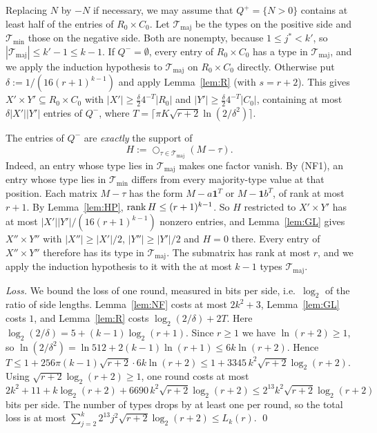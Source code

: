 Replacing $N$ by $-N$ if necessary, we may assume that $Q^+=\{N>0\}$ contains at least half of the entries of
$R_0\times C_0$. Let $\mathcal T_{\mathrm{maj}}$ be the types on the positive side and $\mathcal T_{\mathrm{min}}$ those on the
negative side. Both are nonempty, because $1\le j^\ast<k'$, so $|\mathcal T_{\mathrm{maj}}|\le k'-1\le k-1$. If
$Q^-=\emptyset$, every entry of $R_0\times C_0$ has a type in $\mathcal T_{\mathrm{maj}}$, and we apply the induction
hypothesis to $\mathcal T_{\mathrm{maj}}$ on $R_0\times C_0$ directly. Otherwise put $\delta:=1/(16(r+1)^{k-1})$ and
apply Lemma~\ref{lem:R} (with $s=r+2$). This gives $X'\times Y'\subseteq R_0\times C_0$ with
$|X'|\ge\frac\delta24^{-T}|R_0|$ and $|Y'|\ge\frac\delta24^{-T}|C_0|$, containing at most $\delta|X'||Y'|$ entries of
$Q^-$, where $T=\lceil\pi K\sqrt{r+2}\ln(2/\delta^2)\rceil$.

The entries of $Q^-$ are \emph{exactly} the support of
\[
  H:=\mathop{\bigcirc}_{\tau\in\mathcal T_{\mathrm{maj}}}(M-\tau).
\]
Indeed, an entry whose type lies in $\mathcal T_{\mathrm{maj}}$ makes one factor vanish. By (NF1), an entry whose
type lies in $\mathcal T_{\mathrm{min}}$ differs from every majority-type value at that position. Each matrix
$M-\tau$ has the form $M-a\mathbf 1^T$ or $M-\mathbf 1b^T$, of rank at most $r+1$. By Lemma~\ref{lem:HP},
$\operatorname{rank} H\le(r+1)^{k-1}$. So $H$ restricted to $X'\times Y'$ has at most $|X'||Y'|/(16(r+1)^{k-1})$ nonzero entries,
and Lemma~\ref{lem:GL} gives $X''\times Y''$ with $|X''|\ge|X'|/2$, $|Y''|\ge|Y'|/2$ and $H=0$ there. Every entry
of $X''\times Y''$ therefore has its type in $\mathcal T_{\mathrm{maj}}$. The submatrix has rank at most $r$, and we
apply the induction hypothesis to it with the at most $k-1$ types $\mathcal T_{\mathrm{maj}}$.

\emph{Loss.} We bound the loss of one round, measured in bits per side, i.e.\ $\log_2$ of the ratio of side
lengths. Lemma~\ref{lem:NF} costs at most $2k^2+3$, Lemma~\ref{lem:GL} costs $1$, and Lemma~\ref{lem:R} costs
$\log_2(2/\delta)+2T$. Here $\log_2(2/\delta)=5+(k-1)\log_2(r+1)$. Since $r\ge1$ we have $\ln(r+2)\ge1$, so
$\ln(2/\delta^2)=\ln 512+2(k-1)\ln(r+1)\le 6k\ln(r+2)$. Hence
$T\le1+256\pi(k-1)\sqrt{r+2}\cdot 6k\ln(r+2)\le 1+3345\,k^2\sqrt{r+2}\log_2(r+2)$. Using
$\sqrt{r+2}\log_2(r+2)\ge1$, one round costs at most
\[
2k^2+11+k\log_2(r+2)+6690\,k^2\sqrt{r+2}\log_2(r+2)\le 2^{13}k^2\sqrt{r+2}\log_2(r+2)
\]
bits per side. The number of types drops by at least one per round, so the total loss is at most
$\sum_{j=2}^k2^{13}j^2\sqrt{r+2}\log_2(r+2)\le L_k(r)$. \qed

